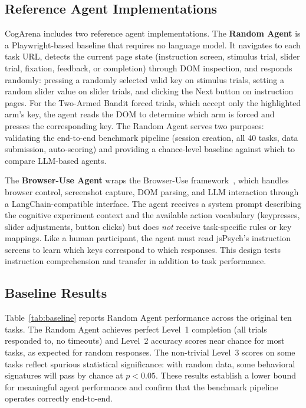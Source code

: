 \documentclass{article}
\begin{document}
\subsection{Reference Agent Implementations}

CogArena includes two reference agent implementations. The \textbf{Random Agent} is a Playwright-based baseline that requires no language model. It navigates to each task URL, detects the current page state (instruction screen, stimulus trial, slider trial, fixation, feedback, or completion) through DOM inspection, and responds randomly: pressing a randomly selected valid key on stimulus trials, setting a random slider value on slider trials, and clicking the Next button on instruction pages. For the Two-Armed Bandit forced trials, which accept only the highlighted arm's key, the agent reads the DOM to determine which arm is forced and presses the corresponding key. The Random Agent serves two purposes: validating the end-to-end benchmark pipeline (session creation, all 40 tasks, data submission, auto-scoring) and providing a chance-level baseline against which to compare LLM-based agents.

The \textbf{Browser-Use Agent} wraps the Browser-Use framework~\citep{browseruse2024}, which handles browser control, screenshot capture, DOM parsing, and LLM interaction through a LangChain-compatible interface. The agent receives a system prompt describing the cognitive experiment context and the available action vocabulary (keypresses, slider adjustments, button clicks) but does \emph{not} receive task-specific rules or key mappings. Like a human participant, the agent must read jsPsych's instruction screens to learn which keys correspond to which responses. This design tests instruction comprehension and transfer in addition to task performance.

\subsection{Baseline Results}

Table~\ref{tab:baseline} reports Random Agent performance across the original ten tasks. The Random Agent achieves perfect Level~1 completion (all trials responded to, no timeouts) and Level~2 accuracy scores near chance for most tasks, as expected for random responses. The non-trivial Level~3 scores on some tasks reflect spurious statistical significance: with random data, some behavioral signatures will pass by chance at $p < 0.05$. These results establish a lower bound for meaningful agent performance and confirm that the benchmark pipeline operates correctly end-to-end.
\end{document}
